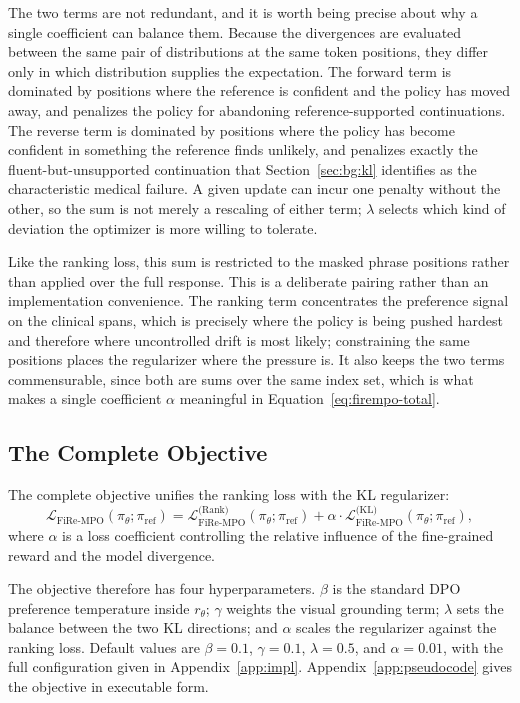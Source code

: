 The two terms are not redundant, and it is worth being precise about why a single coefficient can balance them. Because the divergences are evaluated between the same pair of distributions at the same token positions, they differ only in which distribution supplies the expectation. The forward term is dominated by positions where the reference is confident and the policy has moved away, and penalizes the policy for abandoning reference-supported continuations. The reverse term is dominated by positions where the policy has become confident in something the reference finds unlikely, and penalizes exactly the fluent-but-unsupported continuation that Section~\ref{sec:bg:kl} identifies as the characteristic medical failure. A given update can incur one penalty without the other, so the sum is not merely a rescaling of either term; $\lambda$ selects which kind of deviation the optimizer is more willing to tolerate.

Like the ranking loss, this sum is restricted to the masked phrase positions rather than applied over the full response. This is a deliberate pairing rather than an implementation convenience. The ranking term concentrates the preference signal on the clinical spans, which is precisely where the policy is being pushed hardest and therefore where uncontrolled drift is most likely; constraining the same positions places the regularizer where the pressure is. It also keeps the two terms commensurable, since both are sums over the same index set, which is what makes a single coefficient $\alpha$ meaningful in Equation~\ref{eq:firempo-total}.

\subsection{The Complete Objective}
\label{sec:met:objective}

The complete \ourloss{} objective unifies the ranking loss with the KL regularizer:
\begin{equation}\label{eq:firempo-total}
\mathcal{L}_{\text{FiRe-MPO}}(\pi_\theta; \pi_{\text{ref}}) = \mathcal{L}^{\text{(Rank)}}_{\text{FiRe-MPO}}(\pi_{\theta};\pi_{\text{ref}}) + \alpha \cdot \mathcal{L}_{\text{FiRe-MPO}}^{\text{(KL)}}(\pi_\theta; \pi_{\text{ref}}),
\end{equation}
where $\alpha$ is a loss coefficient controlling the relative influence of the fine-grained reward and the model divergence.

The objective therefore has four hyperparameters. $\beta$ is the standard DPO preference temperature inside $r_\theta$; $\gamma$ weights the visual grounding term; $\lambda$ sets the balance between the two KL directions; and $\alpha$ scales the regularizer against the ranking loss. Default values are $\beta = 0.1$, $\gamma = 0.1$, $\lambda = 0.5$, and $\alpha = 0.01$, with the full configuration given in Appendix~\ref{app:impl}. Appendix~\ref{app:pseudocode} gives the objective in executable form.

